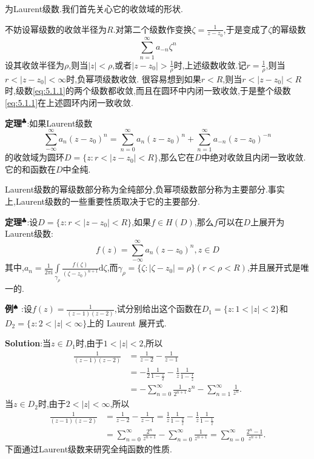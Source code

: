 为Laurent级数.我们首先关心它的收敛域的形状.\par
不妨设幂级数的收敛半径为$R$.对第二个级数作变换$\zeta=\frac{1}{z-z_0}$,于是变成了$\zeta$的幂级数
$$
\sum^{\infty}_{n=1}a_{-n}\zeta ^n
$$
设其收敛半径为$\rho$,则当$|z|<\rho$,或者$|z-z_0|>\frac{1}{\rho}$时,上述级数收敛.记$r = \frac{1}{\rho}$,则当$r < |z-z_0| < \infty$时,负幂项级数收敛. 很容易想到如果$r<R$,则当$r<|z-z_0|<R$时,级数\eqref{eq:5.1.1}的两个级数都收敛,而且在圆环中内闭一致收敛,于是整个级数\eqref{eq:5.1.1}在上述圆环内闭一致收敛.\par
\textbf{定理}$^\clubsuit$:如果Laurent级数
$$
\sum^{\infty}_{-\infty}a_n (z-z_0)^n=\sum^{\infty}_{n=0}a_n (z-z_0)^n+\sum^{\infty}_{n=1}a_{-n} (z-z_0)^{-n}
$$
的收敛域为圆环$D=\{z:r<|z-z_0|<R\}$,那么它在$D$中绝对收敛且内闭一致收敛.它的和函数在$D$中全纯.\par
Laurent级数的幂级数部分称为全纯部分,负幂项级数部分称为主要部分.事实上,Laurent级数的一些重要性质取决于它的主要部分.\par
\textbf{定理}$^\clubsuit$:设$D=\{z:r<|z-z_0|<R\}$,如果$f\in H(D)$,那么$f$可以在$D$上展开为Laurent级数:
$$
f(z)=\sum^{\infty}_{-\infty}a_n (z-z_0)^n,z\in D
$$
其中,$a_n=\frac{1}{2\pi\mathrm{i}}\int\limits_{\gamma _\rho}\frac{f(\zeta)}{(\zeta-z_0)^{n+1}}\mathrm{d}\zeta$,而$\gamma _\rho=\{\zeta:|\zeta-z_0|=\rho\}(r<\rho<R)$,并且展开式是唯一的.\par
\textbf{例}$^\spadesuit$ :设$f(z)=\frac{1}{(z-1)(z-2)}$,试分别给出这个函数在$D_{1}=\{z:1<|z|<2\}$和$D_{2}=\{z:2<|z|<\infty\}$上的 Laurent 展开式.\par
\textbf{Solution}:当$z\in D_{1}$时,由于$1<|z|<2$,所以
$$
\begin{aligned}
    \frac{1}{(z-1)(z-2)}&=\frac{1}{z-2}-\frac{1}{z-1} \\
                        &=-\frac{1}{2}\frac{1}{1-\frac{z}{2}}-\frac{1}{z}\frac{1}{1-\frac{1}{z}} \\
                        &=-\sum_{n=0}^{\infty}\frac{1}{2^{n+1}}z^{n}-\sum_{n=1}^{\infty}\frac{1}{z^{n}}. 
\end{aligned}
$$
当$z\in D_{2}$时,由于$2<|z|<\infty$,所以
$$
\begin{aligned}
    \frac{1}{(z-1)(z-2)}&=\frac{1}{z-2}-\frac{1}{z-1}=\frac{1}{z}\frac{1}{1-\frac{2}{z}}-\frac{1}{z}\frac{1}{1-\frac{1}{z}} \\
                        &=\sum_{n=0}^{\infty}\frac{2^{n}}{z^{n+1}}-\sum_{n=0}^{\infty}\frac{1}{z^{n+1}}=\sum_{n=0}^{\infty}\frac{2^{n}-1}{z^{n+1}}.
\end{aligned}
$$
\qquad 下面通过Laurent级数来研究全纯函数的性质.\par
